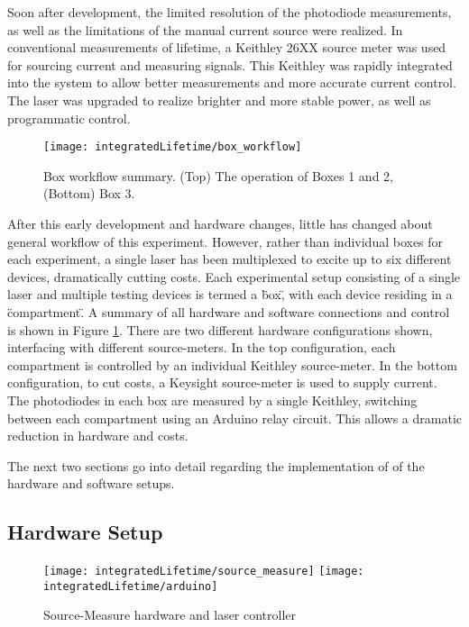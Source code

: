 \documentclass[../thesis.tex]{subfiles}
\begin{document}
Soon after development, the limited resolution of the photodiode measurements, as well as the limitations of the manual current source were realized.
In conventional  measurements of lifetime, a Keithley 26XX source meter was used for sourcing current and measuring signals.  
This Keithley was rapidly integrated into the system to allow better measurements and more accurate current control.
The laser was upgraded to realize brighter and more stable power, as well as programmatic control.  

\begin{figure}[ht]
\centering
\texttt{[image: integratedLifetime/box\_workflow]}
\caption{Box workflow summary.  (Top) The operation of Boxes 1 and 2, (Bottom) Box 3.}
\label{fig:box_workflow}
\end{figure}

After this early development and hardware changes, little has changed about general workflow of this experiment.
However, rather than individual boxes for each experiment, a single laser has been multiplexed to excite up to six different devices, dramatically cutting costs.
Each experimental setup consisting of a single laser and multiple testing devices is termed a \"box\", with each device residing in a \"compartment\".
A summary of all hardware and software connections and control is shown in Figure \ref{fig:box_workflow}.
There are two different hardware configurations shown, interfacing with different source-meters.
In the top configuration, each compartment is controlled by an individual Keithley source-meter.
In the bottom configuration, to cut costs, a Keysight source-meter is used to supply current.  
The photodiodes in each box are measured by a single Keithley, switching between each compartment using an Arduino relay circuit.
This allows a dramatic reduction in hardware and costs.

The next two sections go into detail regarding the implementation of of the hardware and software setups.

\subsection{Hardware Setup}

\begin{figure}[ht]
    \begin{minipage}{\linewidth}
    \centering
    \texttt{[image: integratedLifetime/source\_measure]}
    \texttt{[image: integratedLifetime/arduino]}
    \caption{Source-Measure hardware and laser controller}
    \label{fig:source_measure}
    \end{minipage}
\end{figure}
\end{document}
